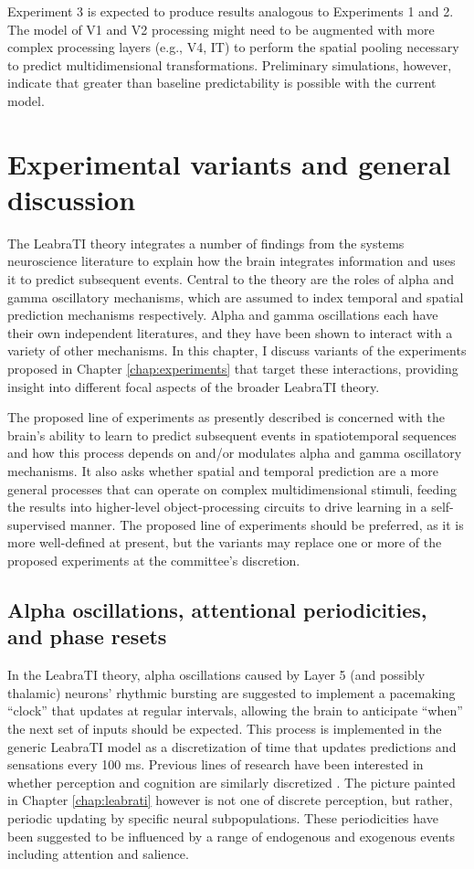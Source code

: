 \documentclass[defaultstyle,12pt]{thesis}
\begin{document}
{Experiment 3 is expected to produce results analogous to Experiments 1 and 2. The model of V1 and V2 processing might need to be augmented with more complex processing layers (e.g., V4, IT) to perform the spatial pooling necessary to predict multidimensional transformations. Preliminary simulations, however, indicate that greater than baseline predictability is possible with the current model.

\chapter{Experimental variants and general discussion}
\label{chap:variants}

The LeabraTI theory integrates a number of findings from the systems neuroscience literature to explain how the brain integrates information and uses it to predict subsequent events. Central to the theory are the roles of alpha and gamma oscillatory mechanisms, which are assumed to index temporal and spatial prediction mechanisms respectively. Alpha and gamma oscillations each have their own independent literatures, and they have been shown to interact with a variety of other mechanisms. In this chapter, I discuss variants of the experiments proposed in Chapter \ref{chap:experiments} that target these interactions, providing insight into different focal aspects of the broader LeabraTI theory. 

The proposed line of experiments as presently described is concerned with the brain's ability to learn to predict subsequent events in spatiotemporal sequences and how this process depends on and/or modulates alpha and gamma oscillatory mechanisms. It also asks whether spatial and temporal prediction are a more general processes that can operate on complex multidimensional stimuli, feeding the results into higher-level object-processing circuits to drive learning in a self-supervised manner. The proposed line of experiments should be preferred, as it is more well-defined at present, but the variants may replace one or more of the proposed experiments at the committee's discretion.

\section{Alpha oscillations, attentional periodicities, and phase resets} 
In the LeabraTI theory, alpha oscillations caused by Layer 5 (and possibly thalamic) neurons' rhythmic bursting are suggested to implement a pacemaking ``clock'' that updates at regular intervals, allowing the brain to anticipate ``when'' the next set of inputs should be expected. This process is implemented in the generic LeabraTI model as a discretization of time that updates predictions and sensations every 100 ms. Previous lines of research have been interested in whether perception and cognition are similarly discretized \cite{VarelaToroJohnEtAl81,VanRullenReddyKoch05,VanRullenKoch03b,VanRullenDubois11}. The picture painted in Chapter \ref{chap:leabrati} however is not one of discrete perception, but rather, periodic updating by specific neural subpopulations. These periodicities have been suggested to be influenced by a range of endogenous and exogenous events including attention and salience.

}
\end{document}

